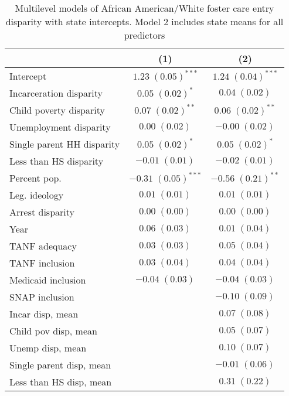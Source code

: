 
\begin{table}
\caption{Multilevel models of African American/White foster care entry disparity with state intercepts. Model 2 includes state means for all predictors }
\begin{center}
\begin{tabular}{l c c }
\hline
 & (1) & (2) \\
\hline
Intercept                  & $1.23 \; (0.05)^{***}$  & $1.24 \; (0.04)^{***}$ \\
Incarceration disparity    & $0.05 \; (0.02)^{*}$    & $0.04 \; (0.02)$       \\
Child poverty disparity    & $0.07 \; (0.02)^{**}$   & $0.06 \; (0.02)^{**}$  \\
Unemployment disparity     & $0.00 \; (0.02)$        & $-0.00 \; (0.02)$      \\
Single parent HH disparity & $0.05 \; (0.02)^{*}$    & $0.05 \; (0.02)^{*}$   \\
Less than HS disparity     & $-0.01 \; (0.01)$       & $-0.02 \; (0.01)$      \\
Percent pop.               & $-0.31 \; (0.05)^{***}$ & $-0.56 \; (0.21)^{**}$ \\
Leg. ideology              & $0.01 \; (0.01)$        & $0.01 \; (0.01)$       \\
Arrest disparity           & $0.00 \; (0.00)$        & $0.00 \; (0.00)$       \\
Year                       & $0.06 \; (0.03)$        & $0.01 \; (0.04)$       \\
TANF adequacy              & $0.03 \; (0.03)$        & $0.05 \; (0.04)$       \\
TANF inclusion             & $0.03 \; (0.04)$        & $0.04 \; (0.04)$       \\
Medicaid inclusion         & $-0.04 \; (0.03)$       & $-0.04 \; (0.03)$      \\
SNAP inclusion             &                         & $-0.10 \; (0.09)$      \\
Incar disp, mean           &                         & $0.07 \; (0.08)$       \\
Child pov disp, mean       &                         & $0.05 \; (0.07)$       \\
Unemp disp, mean           &                         & $0.10 \; (0.07)$       \\
Single parent disp, mean   &                         & $-0.01 \; (0.06)$      \\
Less than HS disp, mean    &                         & $0.31 \; (0.22)$       \\

\end{tabular}
\end{center}
\end{table}
